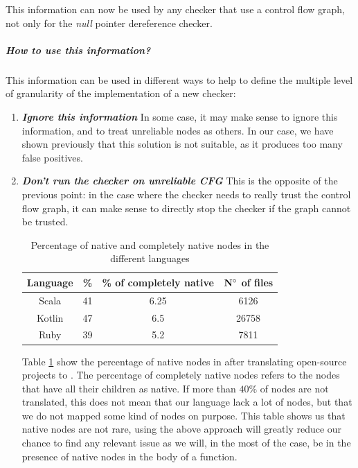 This information can now be used by any checker that use a control flow graph, not only for the \emph{null} pointer dereference checker.

\subparagraph{How to use this information?}
\label{subsubsec:use_unreliable_information}

This information can be used in different ways to help to define the multiple level of granularity of the implementation of a new checker:

\begin{enumerate}
\item \textbf{\textit{Ignore this information}} \newline
In some case, it may make sense to ignore this information, and to treat unreliable nodes as others. 
In our case, we have shown previously that this solution is not suitable, as it produces too many false positives. \newline

\item \textbf{\textit{Don’t run the checker on unreliable CFG}} \newline
This is the opposite of the previous point: in the case where the checker needs to really trust the control flow graph, it can make sense to directly stop the checker if the graph cannot be trusted.

\begin{table}[h]
	\centering
	\caption{Percentage of native and completely native nodes in the different languages}
	\label{table:slang-native-percentage}
	\begin{tabular}{|c|c|c|c|}
		\hline
		\bf Language & \bf \% & \bf \% of completely native & \bf $\bf N^{\circ}$  of files \\ \hline
		Scala &  41 &  6.25 & 6126 \\ 
		Kotlin &  47 &  6.5 & 26758 \\ 
		Ruby &  39 &  5.2 &  7811 \\ \hline
	\end{tabular}
\end{table}

Table \ref{table:slang-native-percentage} show the percentage of native nodes in \slang{} after translating open-source projects \cite{SlangSources:2019:Online} to \slang{}. The percentage of completely native nodes refers to the nodes that have all their children as native. If more than $40\%$ of nodes are not translated, this does not mean that our language lack a lot of nodes, but that we do not mapped some kind of nodes on purpose.
This table shows us that native nodes are not rare, using the above approach will greatly reduce our chance to find any relevant issue as we will, in the most of the case, be in the presence of native nodes in the body of a function.


\end{enumerate}
